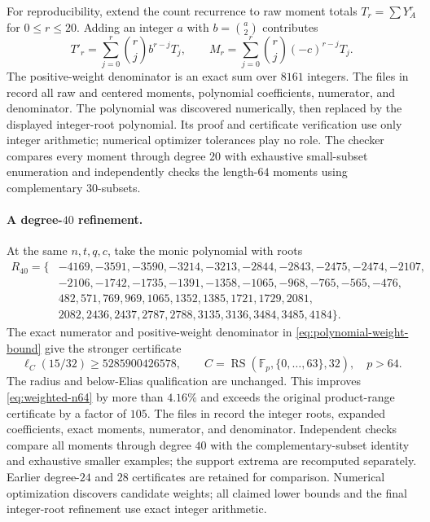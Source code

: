 \documentclass[11pt,letterpaper]{article}
\theoremstyle{definition}
\theoremstyle{remark}
\newcommand{\F}{\mathbb F}
\newcommand{\RS}{\operatorname{RS}}
\begin{document}
For reproducibility, extend the count recurrence to raw moment totals
$T_r=\sum Y_A^r$ for $0\le r\le20$. Adding an integer $a$ with
$b=\binom a2$ contributes
\[
 T'_r=\sum_{j=0}^r\binom rj b^{r-j}T_j,
 \qquad
 M_r=\sum_{j=0}^r\binom rj(-c)^{r-j}T_j.
\]
The positive-weight denominator is an exact sum over $8161$ integers.
The files in  record all raw and
centered moments, polynomial coefficients, numerator, and denominator.
The polynomial was discovered numerically, then replaced by the
displayed integer-root polynomial. Its proof and certificate verification
use only integer arithmetic; numerical optimizer tolerances play no role.
The checker compares every moment through degree $20$ with exhaustive
small-subset enumeration and independently checks the length-$64$
moments using complementary $30$-subsets.

\paragraph{A degree-$40$ refinement.}
At the same $n,t,q,c$, take the monic polynomial with roots
\[
\begin{split}
R_{40}=\{&-4169,-3591,-3590,-3214,-3213,-2844,-2843,-2475,-2474,-2107,\\
    &-2106,-1742,-1735,-1391,-1358,-1065,-968,-765,-565,-476,\\
    &482,571,769,969,1065,1352,1385,1721,1729,2081,\\
    &2082,2436,2437,2787,2788,3135,3136,3484,3485,4184\}.
\end{split}
\]
The exact numerator and positive-weight denominator in
\eqref{eq:polynomial-weight-bound} give the stronger certificate
\begin{equation}\label{eq:weighted-n64-40}
 \ell_C(15/32)\ge5285900426578,\qquad
 C=\RS(\F_p,\{0,\ldots,63\},32),\quad p>64.
\end{equation}
The radius and below-Elias qualification are unchanged. This improves
\eqref{eq:weighted-n64} by more than $4.16\%$ and exceeds the original
product-range certificate by a factor of $105$.
The files in  record the integer roots,
expanded coefficients, exact moments, numerator, and denominator.
Independent checks compare all moments through degree $40$ with the
complementary-subset identity and exhaustive smaller examples; the
support extrema are recomputed separately. Earlier degree-$24$ and
$28$ certificates are retained for comparison. Numerical optimization
discovers candidate weights; all claimed lower bounds and the final
integer-root refinement use exact integer arithmetic.
\end{document}
